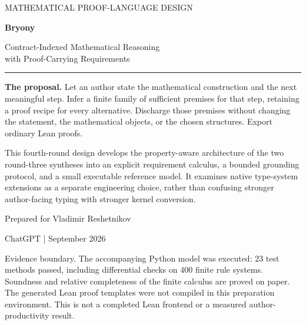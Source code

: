 \documentclass[11pt,a4paper]{article}
\theoremstyle{definition}\newtheorem{definition}[theorem]{Definition}
\theoremstyle{remark}\newtheorem{remark}[theorem]{Remark}
\begin{document}
\hypersetup{pageanchor=false}
\begin{titlepage}
\vspace*{12mm}
{\sffamily\large\color{ink}MATHEMATICAL PROOF-LANGUAGE DESIGN\par}
\vspace{18mm}
{\sffamily\bfseries\color{ink}\fontsize{48}{53}\selectfont Bryony\par}
\vspace{7mm}
{\sffamily\LARGE Contract-Indexed Mathematical Reasoning\\[3pt]with Proof-Carrying Requirements\par}
\vspace{15mm}
\rule{\textwidth}{0.65pt}
\vspace{4mm}
\begin{focusbox}
\textbf{The proposal.} Let an author state the mathematical construction and the next meaningful step. Infer a finite family of sufficient premises for that step, retaining a proof recipe for every alternative. Discharge those premises without changing the statement, the mathematical objects, or the chosen structures. Export ordinary Lean proofs.
\end{focusbox}
\vspace{6mm}
This fourth-round design develops the property-aware architecture of the two round-three syntheses into an explicit requirement calculus, a bounded grounding protocol, and a small executable reference model. It examines native type-system extensions as a separate engineering choice, rather than confusing stronger author-facing typing with stronger kernel conversion.
\vfill
{\sffamily Prepared for Vladimir Reshetnikov\par}
{\sffamily ChatGPT \quad| September 2026\par}
\vspace{5mm}
{\small\color{muted}Evidence boundary. The accompanying Python model was executed: 23 test methods passed, including differential checks on 400 finite rule systems. Soundness and relative completeness of the finite calculus are proved on paper. The generated Lean proof templates were not compiled in this preparation environment. This is not a completed Lean frontend or a measured author-productivity result.}
\end{titlepage}
\hypersetup{pageanchor=true}
\end{document}
